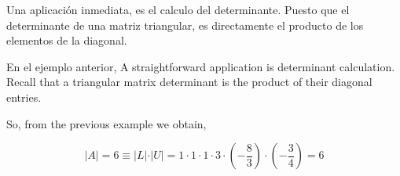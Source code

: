 \begin{paracol}{2}
Una aplicación inmediata, es el calculo del determinante. Puesto que el determinante de una matriz triangular, es directamente el producto de los elementos de la diagonal.

En el ejemplo anterior,
\switchcolumn
 A straightforward application is determinant calculation. Recall that a triangular matrix determinant is the product of their diagonal entries.
 
 So, from the previous example we obtain,
\end{paracol}
\begin{equation*}
\vert A \vert = 6 \equiv \vert L \vert\cdot\vert U\vert =1 \cdot 1 \cdot 1 \cdot 3 \cdot (-\frac{8}{3})\cdot (-\frac{3}{4})=6    
\end{equation*}

